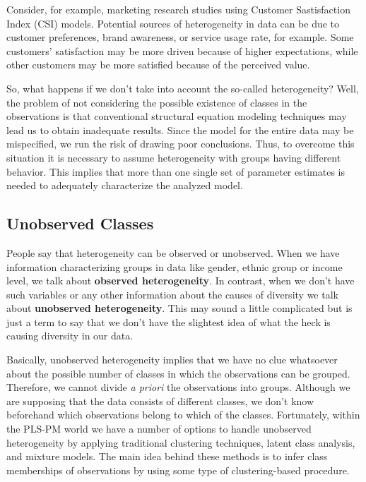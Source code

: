 \documentclass[12pt]{book}\usepackage{graphicx, color}
\begin{document}
Consider, for example, marketing research studies using Customer Sastisfaction Index (CSI) models.  Potential sources of heterogeneity in data can be due to customer preferences, brand awareness, or service usage rate, for example. Some customers' satisfaction may be more driven because of higher expectations, while other customers may be more satisfied because of the perceived value. 

So, what happens if we don't take into account the so-called heterogeneity? Well, the problem of not considering the possible existence of classes in the observations is that conventional structural equation modeling techniques may lead us to obtain inadequate results. Since the model for the entire data may be mispecified, we run the risk of drawing poor conclusions. Thus, to overcome this situation it is necessary to assume heterogeneity with groups having different behavior. This implies that more than one single set of parameter estimates is needed to adequately characterize the analyzed model.



\subsection{Unobserved Classes}
People say that heterogeneity can be observed or unobserved. When we have information characterizing groups in data like gender, ethnic group or income level, we talk about \textbf{observed heterogeneity}. In contrast, when we don't have such variables or any other information about the causes of diversity we talk about \textbf{unobserved heterogeneity}. This may sound a little complicated but is just a term to say that we don't have the slightest idea of what the heck is causing diversity in our data. 

Basically, unobserved heterogeneity implies that we have no clue whatsoever about the possible number of classes in which the observations can be grouped. Therefore, we cannot divide \textit{a priori} the observations into groups. Although we are supposing that the data consists of different classes, we don't know beforehand which observations belong to which of the classes. Fortunately, within the PLS-PM world we have a number of options to handle unobserved heterogeneity by applying traditional clustering techniques, latent class analysis, and mixture models. The main idea behind these methods is to infer class memberships of observations by using some type of clustering-based procedure. 
\end{document}
